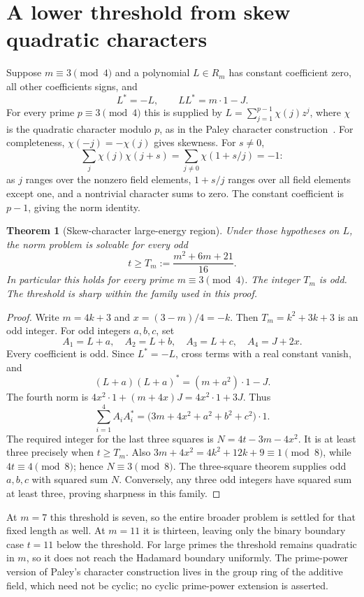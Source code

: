 \documentclass[11pt]{article}
\newtheorem{theorem}{Theorem}
\begin{document}
\section*{A lower threshold from skew quadratic characters}
Suppose $m\equiv3\pmod4$ and a polynomial $L\in R_m$ has constant
coefficient zero, all other coefficients signs, and
\[
 L^*=-L,\qquad LL^*=m\cdot1-J.
\]
For every prime $p\equiv3\pmod4$ this is supplied by
$L=\sum_{j=1}^{p-1}\chi(j)z^j$, where $\chi$ is the quadratic character
modulo $p$, as in the Paley character construction~\cite{Paley}.
For completeness, $\chi(-j)=-\chi(j)$ gives skewness. For $s\ne0$,
\[
 \sum_j\chi(j)\chi(j+s)
 =\sum_{j\ne0}\chi(1+s/j)=-1:
\]
as $j$ ranges over the nonzero field elements, $1+s/j$ ranges over all
field elements except one, and a nontrivial character sums to zero.
The constant coefficient is $p-1$, giving the norm identity.

\begin{theorem}[Skew-character large-energy region]\label{thm:skew}
Under those hypotheses on $L$, the norm problem is solvable for every
odd
\[
 t\ge T_m:=\frac{m^2+6m+21}{16}.
\]
In particular this holds for every prime $m\equiv3\pmod4$.
The integer $T_m$ is odd. The threshold is sharp within the family
used in this proof.
\end{theorem}
\begin{proof}
Write $m=4k+3$ and $x=(3-m)/4=-k$. Then
$T_m=k^2+3k+3$ is an odd integer.
For odd integers $a,b,c$, set
\[
 A_1=L+a,\quad A_2=L+b,\quad A_3=L+c,\quad A_4=J+2x.
\]
Every coefficient is odd. Since $L^*=-L$, cross terms with a real
constant vanish, and
\[
 (L+a)(L+a)^*=(m+a^2)\cdot1-J.
\]
The fourth norm is $4x^2\cdot1+(m+4x)J=4x^2\cdot1+3J$.
Thus
\[
 \sum_{i=1}^4 A_iA_i^*
 =\bigl(3m+4x^2+a^2+b^2+c^2\bigr)\cdot1.
\]
The required integer for the last three squares is
$N=4t-3m-4x^2$. It is at least three precisely when $t\ge T_m$.
Also $3m+4x^2=4k^2+12k+9\equiv1\pmod8$, while $4t\equiv4\pmod8$;
hence $N\equiv3\pmod8$. The three-square theorem supplies odd
$a,b,c$ with squared sum $N$. Conversely, any three odd integers have
squared sum at least three, proving sharpness in this family.
\end{proof}

At $m=7$ this threshold is seven, so the entire broader problem is
settled for that fixed length as well. At $m=11$ it is thirteen, leaving
only the binary boundary case $t=11$ below the threshold. For large
primes the threshold remains quadratic in $m$, so it does not reach
the Hadamard boundary uniformly. The prime-power version of Paley's
character construction lives in the group ring of the additive field,
which need not be cyclic; no cyclic prime-power extension is asserted.
\end{document}
